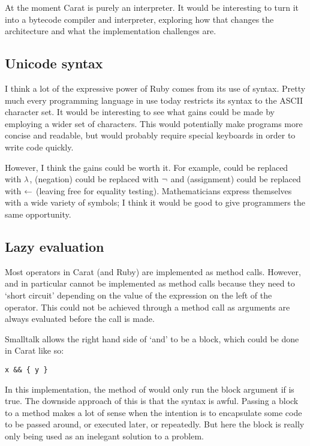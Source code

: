 At the moment Carat is purely an interpreter. It would be interesting to turn it into a bytecode compiler and interpreter, exploring how that changes the architecture and what the implementation challenges are.

\subsection{Unicode syntax}

I think a lot of the expressive power of Ruby comes from its use of syntax. Pretty much every programming language in use today restricts its syntax to the ASCII character set. It would be interesting to see what gains could be made by employing a wider set of characters. This would potentially make programs more concise and readable, but would probably require special keyboards in order to write code quickly.

However, I think the gains could be worth it. For example,  could be replaced with $\color{code} \lambda$, \code{!} (negation) could be replaced with $\color{code} \neg$ and \code{=} (assignment) could be replaced with $\color{code} \leftarrow$ (leaving \code{=} free for equality testing). Mathematicians express themselves with a wide variety of symbols; I think it would be good to give programmers the same opportunity.

\subsection{Lazy evaluation}

Most operators in Carat (and Ruby) are implemented as method calls. However, \code{&&} and \code{||} in particular cannot be implemented as method calls because they need to `short circuit' depending on the value of the expression on the left of the operator. This could not be achieved through a method call as arguments are always evaluated before the call is made.

Smalltalk allows the right hand side of `and' to be a block, which could be done in Carat like so:

\begin{lstlisting}
x && { y }
\end{lstlisting}

In this implementation, the \code{&&} method of  would only run the block argument if  is true. The downside approach of this is that the syntax is awful. Passing a block to a method makes a lot of sense when the intention is to encapsulate some code to be passed around, or executed later, or repeatedly. But here the block is really only being used as an inelegant solution to a problem.

